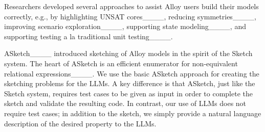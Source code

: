 Researchers developed several approaches to assist Alloy users build
their models correctly, e.g., by highlighting UNSAT
cores____, reducing
symmetries____,
improving scenario
exploration____,
supporting state
modeling____,
and supporting testing a la traditional unit
testing____.

ASketch____ introduced sketching of Alloy
models in the spirit of the Sketch system.  The heart of ASketch is an
efficient enumerator for non-equivalent relational
expressions____.  We use the basic ASketch
approach for creating the sketching problems for the LLMs.  A key
difference is that ASketch, just like the Sketch system, requires test
cases to be given as input in order to complete the sketch and
validate the resulting code.  In contrast, our use of LLMs does not
require test cases; in addition to the sketch, we simply provide a
natural language description of the desired property to the LLMs.


